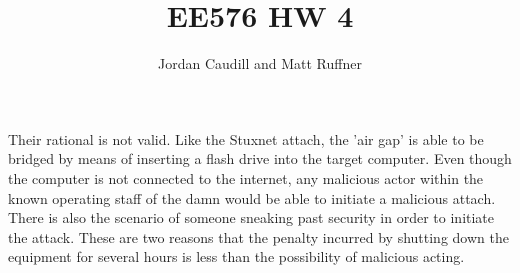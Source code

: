 \documentclass[letterpaper]{article}
\title{EE576 HW 4}
\author{Jordan Caudill and Matt Ruffner}
\begin{document}
\maketitle

\section{}
Their rational is not valid. Like the Stuxnet attach, the 'air gap' is able to be bridged by means of inserting a flash drive into the target computer. Even though the computer is not connected to the internet, any malicious actor within the known operating staff of the damn would be able to initiate a malicious attach. There is also the scenario of someone sneaking past security in order to initiate the attack. These are two reasons that the penalty incurred by shutting down the equipment for several hours is less than the possibility of malicious acting.


\end{document}
